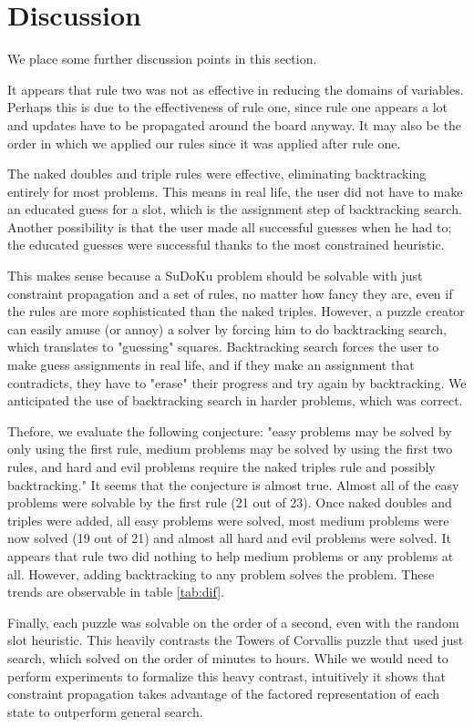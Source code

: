 \section{Discussion}\label{sec:dis}

We place some further discussion points in this section.

It appears that rule two was not as effective in reducing the domains of variables. Perhaps this is due to the effectiveness of rule one, since rule one appears a lot and updates have to be propagated around the board anyway. It may also be the order in which we applied our rules since it was applied after rule one.

The naked doubles and triple rules were effective, eliminating backtracking entirely for most problems. This means in real life, the user did not have to make an educated guess for a slot, which is the assignment step of backtracking search. Another possibility is that the user made all successful guesses when he had to; the educated guesses were successful thanks to the most constrained heuristic.

This makes sense because a SuDoKu problem should be solvable with just constraint propagation and a set of rules, no matter how fancy they are, even if the rules are more sophisticated than the naked triples. However, a puzzle creator can easily amuse (or annoy) a solver by forcing him to do backtracking search, which translates to "guessing" squares. Backtracking search forces the user to make guess assignments in real life, and if they make an assignment that contradicts, they have to "erase" their progress and try again by backtracking. We anticipated the use of backtracking search in harder problems, which was correct.

Thefore, we evaluate the following conjecture: "easy problems may be solved by only using the first rule, medium problems may be solved by using the first two rules, and hard and evil problems require the naked triples rule and possibly backtracking." It seems that the conjecture is almost true. Almost all of the easy problems were solvable by the first rule (21 out of 23). Once naked doubles and triples were added, all easy problems were solved, most medium problems were now solved (19 out of 21) and almost all hard and evil problems were solved. It appears that rule two did nothing to help medium problems or any problems at all. However, adding backtracking to any problem solves the problem. These trends are observable in table \ref{tab:dif}. 

Finally, each puzzle was solvable on the order of a second, even with the random slot heuristic. This heavily contrasts the Towers of Corvallis puzzle that used just search, which solved on the order of minutes to hours. While we would need to perform experiments to formalize this heavy contrast, intuitively it shows that constraint propagation takes advantage of the factored representation of each state to outperform general search.
